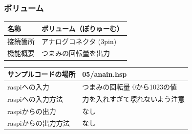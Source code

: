 \documentclass[text05.tex]{subfiles}
\begin{document}
\subsubsection{ボリューム}\label{volume}
\begin{table}[H]
  \begin{widerrows}
    \begin{tabular}{|p{\colF}|p{\colG}|}	\hline
    名称 & ボリューム（ぼりゅーむ）\\ \hline
    接続箇所 & アナログコネクタ (3pin)\\ \hline
    機能概要 & つまみの回転量を出力\\ \hline
    \end{tabular}
  \end{widerrows} 
\end{table}

\begin{table}[H]
  \begin{widerrows}
    \begin{tabular}{|p{\colF}|p{\colG}|}	\hline
    サンプルコードの場所 & 05/anain.hsp\\ \hline
    raspiへの入力 & つまみの回転量 0から1023の値\\ \hline
    raspiへの入力方法 & 力を入れすぎて壊れないよう注意\\ \hline
    raspiからの出力 & なし\\ \hline
    raspiからの出力方法 & なし\\ \hline
    \end{tabular}
  \end{widerrows} 
\end{table}
\end{document}
